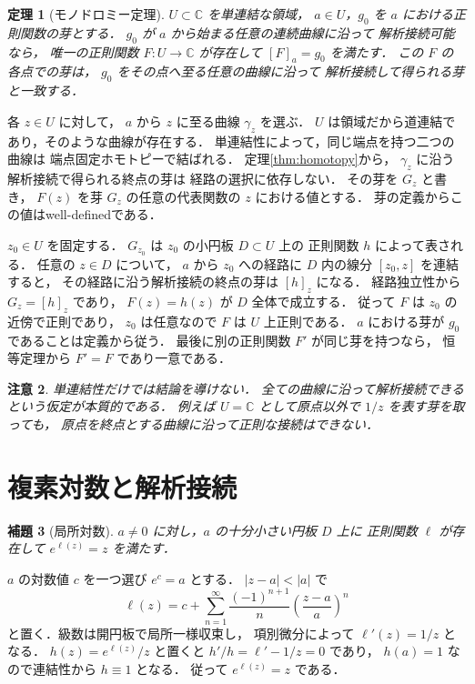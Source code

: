 \documentclass[a5paper,10pt,onecolumn]{jsarticle}
\makeatletter
\theoremstyle{mathnotetheorem}
\newtheorem{theorem}{定理}[section]
\newtheorem{lemma}[theorem]{補題}
\newtheorem{remark}[theorem]{注意}
\renewcommand{\proofname}{証明}
\renewenvironment{proof}[1][\proofname]{%
  \par\pushQED{\qed}\normalfont\topsep4\p@\@plus2\p@\relax
  \trivlist\item[\hskip\labelsep\bfseries #1]\ignorespaces
}{\popQED\endtrivlist\@endpefalse}
\makeatother
\begin{document}
\begin{theorem}[モノドロミー定理]\label{thm:monodromy}
$U\subset\mathbb C$ を単連結な領域，
$a\in U$，$g_0$ を $a$ における正則関数の芽とする．
$g_0$ が $a$ から始まる任意の連続曲線に沿って
解析接続可能なら，
唯一の正則関数 $F:U\to\mathbb C$ が存在して
$[F]_a=g_0$ を満たす．
この $F$ の各点での芽は，
$g_0$ をその点へ至る任意の曲線に沿って
解析接続して得られる芽と一致する．
\end{theorem}
\begin{proof}
各 $z\in U$ に対して，
$a$ から $z$ に至る曲線 $\gamma_z$ を選ぶ．
$U$ は領域だから道連結であり，そのような曲線が存在する．
単連結性によって，同じ端点を持つ二つの曲線は
端点固定ホモトピーで結ばれる．
定理\ref{thm:homotopy}から，
$\gamma_z$ に沿う解析接続で得られる終点の芽は
経路の選択に依存しない．
その芽を $G_z$ と書き，
$F(z)$ を芽 $G_z$ の任意の代表関数の $z$ における値とする．
芽の定義からこの値はwell-definedである．

$z_0\in U$ を固定する．
$G_{z_0}$ は $z_0$ の小円板 $D\subset U$ 上の
正則関数 $h$ によって表される．
任意の $z\in D$ について，
$a$ から $z_0$ への経路に
$D$ 内の線分 $[z_0,z]$ を連結すると，
その経路に沿う解析接続の終点の芽は $[h]_z$ になる．
経路独立性から $G_z=[h]_z$ であり，
$F(z)=h(z)$ が $D$ 全体で成立する．
従って $F$ は $z_0$ の近傍で正則であり，
$z_0$ は任意なので $F$ は $U$ 上正則である．
$a$ における芽が $g_0$ であることは定義から従う．
最後に別の正則関数 $F'$ が同じ芽を持つなら，
恒等定理から $F'=F$ であり一意である．
\end{proof}

\begin{remark}
単連結性だけでは結論を導けない．
全ての曲線に沿って解析接続できるという仮定が本質的である．
例えば $U=\mathbb C$ として原点以外で
$1/z$ を表す芽を取っても，
原点を終点とする曲線に沿って正則な接続はできない．
\end{remark}

\section{複素対数と解析接続}

\begin{lemma}[局所対数]\label{lem:local-log}
$a\ne0$ に対し，$a$ の十分小さい円板 $D$ 上に
正則関数 $\ell$ が存在して
$e^{\ell(z)}=z$ を満たす．
\end{lemma}
\begin{proof}
$a$ の対数値 $c$ を一つ選び $e^c=a$ とする．
$|z-a|<|a|$ で
\[
 \ell(z)=c+\sum_{n=1}^\infty
 \frac{(-1)^{n+1}}n\left(\frac{z-a}{a}\right)^n
\]
と置く．級数は開円板で局所一様収束し，
項別微分によって
$\ell'(z)=1/z$ となる．
$h(z)=e^{\ell(z)}/z$ と置くと
$h'/h=\ell'-1/z=0$ であり，
$h(a)=1$ なので連結性から $h\equiv1$ となる．
従って $e^{\ell(z)}=z$ である．
\end{proof}
\end{document}
